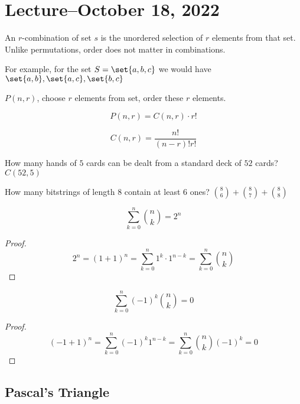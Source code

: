 \documentclass{scrreprt}
\begin{document}
\section{Lecture--October 18, 2022}

An $r$-combination of set $s$ is the unordered selection of $r$ elements from that set.
Unlike permutations, order does not matter in combinations.

For example, for the set $S = \set{a, b, c}$ we would have $\set{a, b}, \set{a, c}, \set{b, c}$

$P(n, r)$, choose $r$ elements from set, order these $r$ elements.

\[
    P(n,r) = C(n,r)\cdot r!
\]

\[
    C(n, r) = \frac{n!}{(n-r)!r!}
\]

How many hands of $5$ cards can be dealt from a standard deck of $52$ cards? $C(52, 5)$

\begin{example}
    How many bitstrings of length $8$ contain at least $6$ ones? ${8\choose 6} + {8\choose 7} + {8\choose 8}$
\end{example}

\begin{corollary}
    \[
        \sum_{k=0}^n{n\choose k} = 2^n
    \]

    \begin{proof}
        \[
            2^n = (1 + 1)^n = \sum_{k=0}^n 1^k \cdot 1^{n-k} = \sum_{k=0}^n{n\choose k}
        \]
    \end{proof}
\end{corollary}

\begin{corollary}
    \[
        \sum_{k=0}^n(-1)^k{n\choose k} = 0
    \]

    \begin{proof}
        \[
            (-1 + 1)^n = \sum_{k=0}^n (-1)^k 1^{n-k} = \sum_{k=0}^n {n\choose k} (-1)^k = 0
        \]
    \end{proof}
\end{corollary}

\subsection{Pascal's Triangle}
\end{document}
